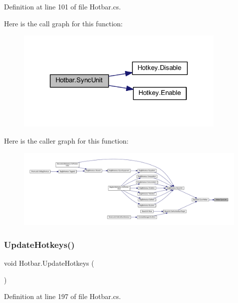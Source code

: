 Definition at line 101 of file Hotbar.\+cs.

Here is the call graph for this function\+:
\nopagebreak
\begin{figure}[H]
\begin{center}
\leavevmode
\includegraphics[width=287pt]{class_hotbar_a1e796a0a133ee0743aa8585c05980f9b_cgraph}
\end{center}
\end{figure}
Here is the caller graph for this function\+:
\nopagebreak
\begin{figure}[H]
\begin{center}
\leavevmode
\includegraphics[width=350pt]{class_hotbar_a1e796a0a133ee0743aa8585c05980f9b_icgraph}
\end{center}
\end{figure}
\mbox{\label{class_hotbar_a1b1cab633f4bf2347af2c0f04fa4b856}} 
\subsubsection{\texorpdfstring{UpdateHotkeys()}{UpdateHotkeys()}}
{\footnotesize\ttfamily void Hotbar.\+Update\+Hotkeys (\begin{DoxyParamCaption}{ }\end{DoxyParamCaption})}



Definition at line 197 of file Hotbar.\+cs.

